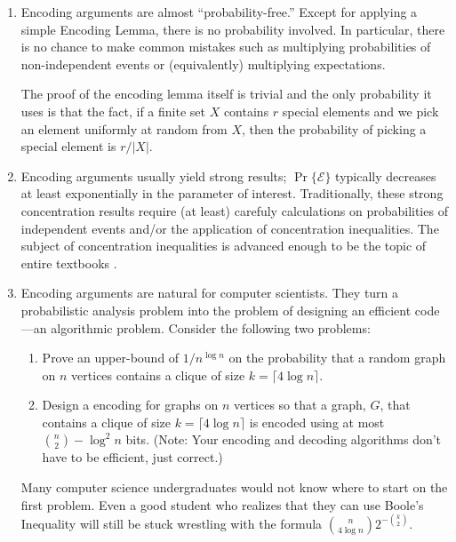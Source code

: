\documentclass[lotsofwhite]{patmorin}
\begin{document}
\begin{enumerate}
  \item Encoding arguments are almost ``probability-free.''  Except for
  applying a simple Encoding Lemma, there is no probability involved.
  In particular, there is no chance to make common mistakes such as
  multiplying probabilities of non-independent events or (equivalently)
  multiplying expectations.  

  The proof of the encoding lemma itself is trivial and the only
  probability it uses is that the fact, if a finite set $X$ contains $r$
  special elements and we pick an element uniformly at random from $X$,
  then the probability of picking a special element is $r/|X|$.

  \item Encoding arguments usually yield strong results;
  $\Pr\{\mathcal{E}\}$ typically decreases at least exponentially in
  the parameter of interest. Traditionally, these strong concentration
  results require (at least) carefuly calculations on probabilities of
  independent events and/or the application of concentration inequalities.
  The subject of concentration inequalities is advanced enough to be
  the topic of entire textbooks \cite{A,B}.
  
  \item Encoding arguments are natural for computer scientists. They
  turn a probabilistic analysis problem into the problem of designing an
  efficient code---an algorithmic problem. Consider the following 
  two problems:
    \begin{enumerate}

    \item Prove an upper-bound of $1/n^{\log n}$ on the probability that
       a random graph on $n$ vertices contains a clique of size $k=\lceil
       4\log n\rceil$.

    \item Design a encoding for graphs on $n$ vertices so that a graph,
       $G$, that contains a clique of size $k=\lceil 4\log n\rceil$
       is encoded using at most $\binom{n}{2}-\log^2 n$ bits. (Note:
       Your encoding and decoding algorithms don't have to be efficient,
       just correct.)
    \end{enumerate}
  Many computer science undergraduates would not know where to start
  on the first problem.  Even a good student who realizes that
  they can use Boole's Inequality will still be stuck
  wrestling with the formula $\binom{n}{4\log n}2^{-\binom{k}{2}}$.  
\end{enumerate}
\end{document}
